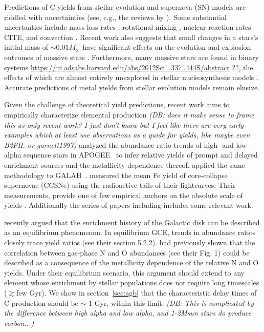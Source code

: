 \documentclass[fleqn,
usenatbib]{mnras}
\newcommand{\add}[1]{{\color{ForestGreen} #1}}
\newcommand{\dbadd}[1]{{\color{Thistle} #1}}
\newcommand{\dbnote}[1]{ {\color{Thistle} \textit{\small (DB: #1)}} }
\begin{document}
Predictions of C yields from stellar evolution and supernova (SN) models are riddled with uncertainties (see, e.g., the reviews by \citealt{romano+10, KL14}).
Some \dbadd{substantial uncertanties} include mass loss rates \citep{sukhbold+16, beasor+2020}, rotational mixing \citep{frischknecht+16, LC18}, nuclear reaction rates \dbadd{CITE}, and convection \citep{chieffi2001, ventura+13}.
Recent work also suggests that small changes in a stars's initial mass of 
 $\sim$$0.01 M_\odot$  have significant effects on the evolution and explosion outcomes of massive stars \citep{bruenn+2023, vartanyan_burrows2023}.
Furthermore, many \add{massive} stars are found in binary systems \dbadd{\url{https://ui.adsabs.harvard.edu/abs/2012Sci...337..444S/abstract} ??}, the effects of which are almost entirely
unexplored in stellar nucleosynthesis models \citet{farmer+21}.
Accurate predictions of metal yields from stellar evolution models remain elusive.

Given the challenge of theoretical yield predictions, recent work aims to empirically characterize elemental production \dbnote{does it make sense to frame this as only recent work? I just don't know but I feel like there are very early examples which at least use observations as a guide for yields, like maybe even B2FH. or garnett1997}
\citet{weinberg+19, weinberg+22} analyzed the abundance ratio trends of high- and low-alpha sequence stars in APOGEE~\citep{apogee17} to infer relative yields of prompt and delayed enrichment sources and the metallicity dependence thereof.
\citet{emily+19, emily+22, emily+24} applied the same methodology to GALAH~\citep{DeSilva2015, Martell2017}.
\citet{rodriguez+21, rodriguez+23} measured the mean Fe yield of core-collapse supernovae (CCSNe) using the radioactive tails of their lightcurves.
Their measurements, provide one of few empirical anchors on the absolute scale of yields \citep{david_fe}.
\dbadd{Additionally the series of papers including \citet{eitner+2020} includes some relevant work.}


\citet{james+24} recently argued that the enrichment history of the Galactic disk can be described as an equilibrium phenomenon.
In equilibrium GCE, trends in abundance ratios closely trace yield ratios (see their section 5.2.2).
\citet{james+23} had previously shown that the correlation between gas-phase N and O abundances (see their Fig. 1) could be described as a consequence of the metallicity dependence of the relative N and O yields.
Under their equilibrium scenario, this argument should extend to any element whose enrichment by stellar populations does not require long timescales ($\gtrsim$few Gyr).
We show in section~\ref{sec:agb} that the characteristic delay times of C production should be $\sim$ 1 Gyr, within this limit. 
\dbnote{This is complicated by the difference between high alpha and low alpha, and 1-2Msun stars do produce carbon...}
\end{document}
